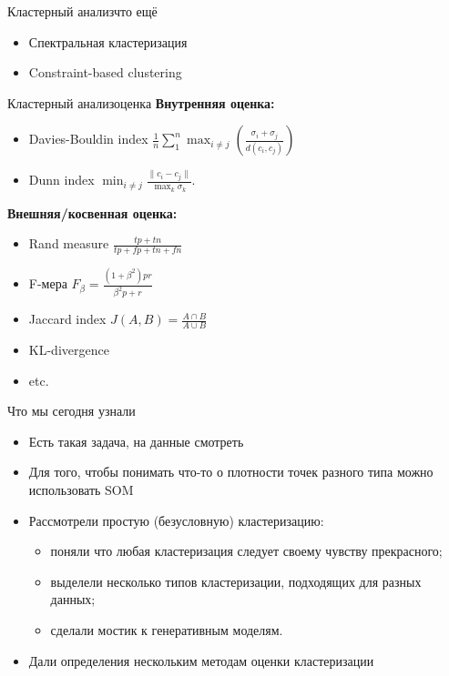 \documentclass[14pt, fleqn, xcolor={dvipsnames, table}]{beamer}
\begin{document}
\begin{frame}{Кластерный анализ}{что ещё}
\begin{itemize}
  \item Спектральная кластеризация
  \item Constraint-based clustering 
\end{itemize}
\end{frame}

\begin{frame}{Кластерный анализ}{оценка}
\textbf{Внутренняя оценка:}
\begin{itemize}
  \item Davies-Bouldin index $\frac{1}{n}\sum_1^n \max_{i \ne j}(\frac{\sigma_i + \sigma_j}{d(c_i, c_j)})$
  \item Dunn index $\min_{i \ne j} \frac{\|c_i - c_j\|}{\max_k \sigma_k}$.
\end{itemize}
\textbf{Внешняя/косвенная оценка:} 
\begin{itemize}
  \item Rand measure $\frac{tp+tn}{tp+fp+tn+fn}$
  \item F-мера $F_{\beta} = \frac {(1 + \beta^2)pr}{\beta^2p + r}$
  \item Jaccard index $J(A,B) = \frac{A\cap B}{A\cup B}$
  \item KL-divergence
  \item etc.
\end{itemize}
\end{frame}

\begin{frame}{Что мы сегодня узнали}
\begin{itemize}
  \item Есть такая задача, на данные смотреть
  \item Для того, чтобы понимать что-то о плотности точек разного типа можно использовать SOM
  \item Рассмотрели простую (безусловную) кластеризацию:
  \begin{itemize}
    \item поняли что любая кластеризация следует своему чувству прекрасного;
    \item выделели несколько типов кластеризации, подходящих для разных данных;
    \item сделали мостик к генеративным моделям.
  \end{itemize}
  \item Дали определения нескольким методам оценки кластеризации
\end{itemize}
\end{frame}
\end{document}
